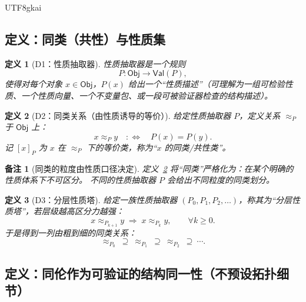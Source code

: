 \documentclass[12pt]{article}
\newtheorem{definition}{定义}[section]
\newtheorem{remark}{备注}[section]
\begin{document}
\begin{CJK*}{UTF8}{gkai}
\subsection{定义：同类（共性）与性质集}
\label{subsec:tex19-appA-class-and-properties}

\begin{definition}[D1：性质抽取器]
\label{def:tex19-appA-D1-property-extractor}
性质抽取器是一个规则
\[
P:\mathsf{Obj}\to \mathsf{Val}(P),
\]
使得对每个对象 $x\in\mathsf{Obj}$，$P(x)$ 给出一个“性质描述”（可理解为一组可检验性质、一个性质向量、一个不变量包、或一段可被验证器检查的结构描述）。
\end{definition}

\begin{definition}[D2：同类关系（由性质诱导的等价）]
\label{def:tex19-appA-D2-class-relation}
给定性质抽取器 $P$，定义关系 $\approx_P$ 于 $\mathsf{Obj}$ 上：
\[
x\approx_P y\quad:\Longleftrightarrow\quad P(x)=P(y).
\]
记 $[x]_P$ 为 $x$ 在 $\approx_P$ 下的等价类，称为“$x$ 的同类/共性类”。
\end{definition}

\begin{remark}[同类的粒度由性质口径决定]
定义~\ref{def:tex19-appA-D2-class-relation} 将“同类”严格化为：在某个明确的性质体系下不可区分。
不同的性质抽取器 $P$ 会给出不同粒度的同类划分。
\end{remark}

\begin{definition}[D3：分层性质塔]
\label{def:tex19-appA-D3-layered-tower}
给定一族性质抽取器 $(P_0,P_1,P_2,\dots)$，称其为“分层性质塔”，若层级越高区分力越强：
\[
x\approx_{P_{k+1}}y \;\Rightarrow\; x\approx_{P_k}y,\qquad \forall k\ge 0.
\]
于是得到一列由粗到细的同类关系：
\[
\approx_{P_0}\ \supseteq\ \approx_{P_1}\ \supseteq\ \approx_{P_2}\ \supseteq\ \cdots.
\]
\end{definition}

\subsection{定义：同伦作为可验证的结构同一性（不预设拓扑细节）}
\label{subsec:tex19-appA-homotopy-as-verifiable-identity}


\end{CJK*}
\end{document}
